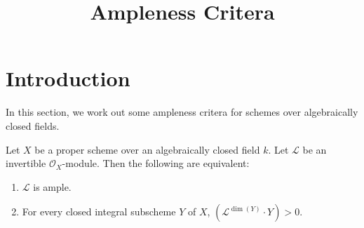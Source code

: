 

\newcommand{\todo}[1]{\footnote{\textbf{TODO.} #1}}

\title{Ampleness Critera}
\maketitle

\section{Introduction}
In this section, we work out some ampleness critera for schemes over
algebraically closed fields.

\begin{theorem}
\label{theorem-nakai-moishezon}
Let $X$ be a proper scheme over an algebraically closed field $k$.
Let $\mathcal{L}$ be an invertible $\mathcal{O}_X$-module.
Then the following are equivalent:
\begin{enumerate}
  \item $\mathcal{L}$ is ample.
  \item For every closed integral subscheme $Y$ of $X$,
    $(\mathcal{L}^{\dim(Y)} \cdot Y) > 0$.
\end{enumerate}
\end{theorem}

